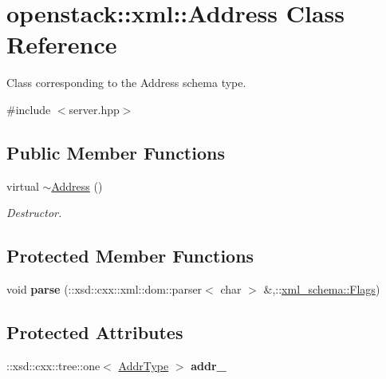 \hypertarget{classopenstack_1_1xml_1_1Address}{
\section{openstack::xml::Address Class Reference}
\label{classopenstack_1_1xml_1_1Address}
}


Class corresponding to the Address schema type.  




{\ttfamily \#include $<$server.hpp$>$}

\subsection*{Public Member Functions}
\begin{DoxyCompactItemize}
\item 
\hypertarget{classopenstack_1_1xml_1_1Address_ad3a1c5cfbba17603776cc8c68b233d6c}{
virtual \hyperlink{classopenstack_1_1xml_1_1Address_ad3a1c5cfbba17603776cc8c68b233d6c}{$\sim$Address} ()}
\label{classopenstack_1_1xml_1_1Address_ad3a1c5cfbba17603776cc8c68b233d6c}

\begin{DoxyCompactList}\small\item\em Destructor. \item\end{DoxyCompactList}\end{DoxyCompactItemize}
\subsection*{Protected Member Functions}
\begin{DoxyCompactItemize}
\item 
\hypertarget{classopenstack_1_1xml_1_1Address_a5cc90ef8f943ab73c65e182c6324710d}{
void {\bfseries parse} (::xsd::cxx::xml::dom::parser$<$ char $>$ \&,::\hyperlink{namespacexml__schema_affb4c227cbd9aa7453dd1dc5a1401943}{xml\_\-schema::Flags})}
\label{classopenstack_1_1xml_1_1Address_a5cc90ef8f943ab73c65e182c6324710d}

\end{DoxyCompactItemize}
\subsection*{Protected Attributes}
\begin{DoxyCompactItemize}
\item 
\hypertarget{classopenstack_1_1xml_1_1Address_a138b55486c71f001538fb3093d1c3c11}{
::xsd::cxx::tree::one$<$ \hyperlink{classopenstack_1_1xml_1_1Address_a768e0cf6818885dce0dc9df43a283011}{AddrType} $>$ {\bfseries addr\_\-}}
\label{classopenstack_1_1xml_1_1Address_a138b55486c71f001538fb3093d1c3c11}

\end{DoxyCompactItemize}
